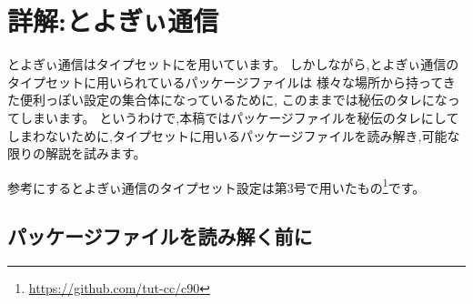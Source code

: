 \newcommand*{\reflisting}[1]{\lstlistingname\ \ref{#1}}
\renewcommand*\descriptionlabel[1]{\normalfont\headfont #1 :\hfil}

\chapter{詳解:とよぎぃ通信}

とよぎぃ通信はタイプセットに{\pLaTeX}を用いています。
しかしながら,とよぎぃ通信のタイプセットに用いられているパッケージファイルは
様々な場所から持ってきた便利っぽい設定の集合体になっているために,
このままでは秘伝のタレになってしまいます。
というわけで,本稿ではパッケージファイルを秘伝のタレにしてしまわないために,タイプセットに用いるパッケージファイルを読み解き,可能な限りの解説を試みます。

参考にするとよぎぃ通信のタイプセット設定は第3号で用いたもの\footnote{\url{https://github.com/tut-cc/c90}}です。

\section{パッケージファイルを読み解く前に}
